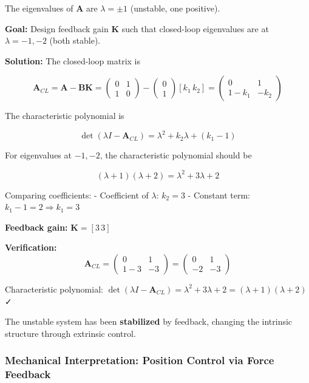 \documentclass[
]{article}
\begin{document}
The eigenvalues of \(\mathbf{A}\) are \(\lambda = \pm 1\) (unstable, one
positive).

\textbf{Goal:} Design feedback gain \(\mathbf{K}\) such that closed-loop
eigenvalues are at \(\lambda = -1, -2\) (both stable).

\textbf{Solution:} The closed-loop matrix is

\[\mathbf{A}_{CL} = \mathbf{A} - \mathbf{BK} = \begin{pmatrix} 0 & 1 \\ 1 & 0 \end{pmatrix} - \begin{pmatrix} 0 \\ 1 \end{pmatrix}[k_1 \, k_2] = \begin{pmatrix} 0 & 1 \\ 1-k_1 & -k_2 \end{pmatrix}\]

The characteristic polynomial is

\[\det(\lambda I - \mathbf{A}_{CL}) = \lambda^2 + k_2\lambda + (k_1 - 1)\]

For eigenvalues at \(-1, -2\), the characteristic polynomial should be

\[(\lambda + 1)(\lambda + 2) = \lambda^2 + 3\lambda + 2\]

Comparing coefficients: - Coefficient of \(\lambda\): \(k_2 = 3\) -
Constant term: \(k_1 - 1 = 2 \Rightarrow k_1 = 3\)

\textbf{Feedback gain:} \(\mathbf{K} = [3 \, 3]\)

\textbf{Verification:}
\[\mathbf{A}_{CL} = \begin{pmatrix} 0 & 1 \\ 1-3 & -3 \end{pmatrix} = \begin{pmatrix} 0 & 1 \\ -2 & -3 \end{pmatrix}\]

Characteristic polynomial:
\(\det(\lambda I - \mathbf{A}_{CL}) = \lambda^2 + 3\lambda + 2 = (\lambda+1)(\lambda+2)\)
✓

The unstable system has been \textbf{stabilized} by feedback, changing
the intrinsic structure through extrinsic control.

\subsubsection{Mechanical Interpretation: Position Control via Force
Feedback}\label{mechanical-interpretation-position-control-via-force-feedback}
\end{document}
